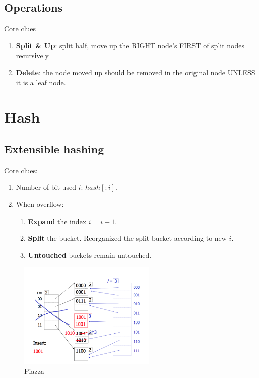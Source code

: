 \documentclass[a4paper]{report}
\begin{document}
\subsection{Operations}
Core clues
\begin{enumerate}
\item \textbf{Split \& Up}: split half, move up the RIGHT node's FIRST of split nodes recursively
\item \textbf{Delete}: the node moved up should be removed in the original node UNLESS it is a leaf node. 
\end{enumerate}

\section{Hash}
\subsection{Extensible hashing}
Core clues:
\begin{enumerate}
\item Number of bit used $i$: $hash[:i]$.
\item When overflow:
  \begin{enumerate}
  \item \textbf{Expand} the index $i=i+1$.
  \item \textbf{Split} the bucket. Reorganized the split bucket according to new $i$.
  \item \textbf{Untouched} buckets remain untouched. 
  \end{enumerate}
\end{enumerate}
\begin{figure}[H]
        \centerline{\includegraphics[height = 2in]{img/extensible_hashing}}
        \caption{Piazza}
    \label{fig:extensibleHashing}
\end{figure}
\end{document}
